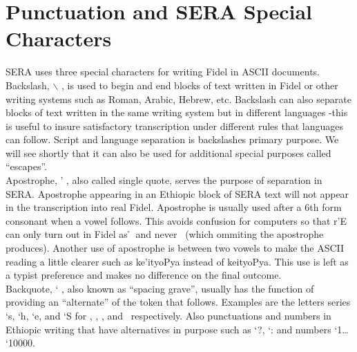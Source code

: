 

\section*{Punctuation and SERA Special Characters} 

SERA uses three special characters for writing Fidel in ASCII documents.
Backslash, $\backslash$ , is used to begin and end blocks of text written in Fidel or other
writing systems such as Roman, Arabic, Hebrew, etc.  Backslash can also separate
blocks of text written in the same writing system but in different languages
-this is useful to insure satisfactory transcription under different rules that
languages can follow.  Script and language separation is backslashes primary
purpose.  We will see shortly that it can also be used for additional special
purposes called ``escapes''. \\

Apostrophe, ' , also called single quote, serves the purpose of separation in SERA.
Apostrophe appearing in an Ethiopic block of SERA text will not appear in the
transcription into real Fidel.  Apostrophe is usually used after a 6th form consonant
when a vowel follows.  This avoids confusion for computers so that r'E can only turn out
in Fidel as \r\E \ and never \rE \ (which ommiting the apostrophe produces).  Another use
of apostrophe is between two vowels to make the ASCII reading a little clearer such as
ke'ityoPya instead of keityoPya.  This use is left as a typist preference and makes no
difference on the final outcome. \\

Backquote, ` , also known as ``spacing grave'', usually has the function of providing
an ``alternate'' of the token that follows.  Examples are the letters series `s, `h,
`e, and `S for \sse, \hhe, \ee, and \SSe \  respectively.  Also punctuations and numbers in
Ethiopic writing that have alternatives in purpose such as `?, `: and numbers `1\dots
`10000. \\

